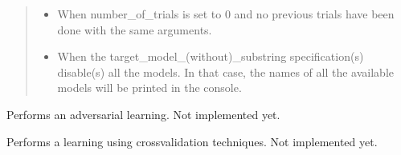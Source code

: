 \documentclass[letterpaper,10pt,english]{sphinxmanual}
\begin{document}
\begin{fulllineitems}
\begin{fulllineitems}
\begin{quote}
\begin{description}
\begin{itemize}
\end{itemize}

\begin{itemize}
\item {} 
\sphinxAtStartPar
{} \textendash{} When number\_of\_trials is set to 0 and no previous trials have been done with the same arguments.

\item {} 
\sphinxAtStartPar
{} \textendash{} When the target\_model\_(without)\_substring specification(s) disable(s) all the models. In that case, the names
    of all the available models will be printed in the console.

\end{itemize}

\end{description}\end{quote}

\end{fulllineitems}


\begin{fulllineitems}
\label{\detokenize{MLSCAlib.Attacks:MLSCAlib.Attacks.profiled.Profiled.train_model_adversarial}}
\pysigstartsignatures
{}
\pysigstopsignatures
\sphinxAtStartPar
Performs an adversarial learning. Not implemented yet.

\end{fulllineitems}


\begin{fulllineitems}
\label{\detokenize{MLSCAlib.Attacks:MLSCAlib.Attacks.profiled.Profiled.train_model_cross_validation}}
\pysigstartsignatures
{}
\pysigstopsignatures
\sphinxAtStartPar
Performs a learning using cross\sphinxhyphen{}validation techniques. Not implemented yet.

\end{fulllineitems}


\end{fulllineitems}
\end{document}
